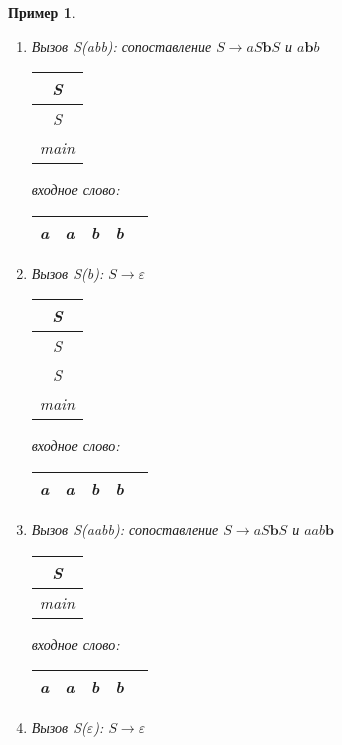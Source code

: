 \documentclass[10pt]{article}         %
\newtheorem{example}{Пример}
\begin{document}
\begin{example}
\begin{enumerate}
			\item Вызов S(abb): сопоставление $S \rightarrow aS\textbf{b}S$ и $a\textbf{b}b$
			
			\begin{tabular}[c]{ |c| } 
				\\ \hline
				S \\ \hline
				S \\ \hline
				main \\ \hline
			\end{tabular}  
			\qquad  \qquad \qquad  \qquad входное слово: \,
			\begin{tabular}[c]{ |c|c|c|c|c| } 
				\hline
				a & a & \textbf{b} & b \\ \hline
			\end{tabular}
		
		\item Вызов S(b): $S \rightarrow \varepsilon$
		
		\begin{tabular}[c]{ |c| } 
			\\ \hline
			S \\ \hline
			S \\ \hline
			S \\ \hline
			main \\ \hline
		\end{tabular}  
		\qquad  \qquad \qquad  \qquad входное слово: \,
		\begin{tabular}[c]{ |c|c|c|c|c| } 
			\hline
			a & a & \textbf{b} & b \\ \hline
		\end{tabular}
		
		\item Вызов S(aabb): сопоставление $S \rightarrow aS\textbf{b}S$ и $aab\textbf{b}$
		
		\begin{tabular}[c]{ |c| } 
			\\ \hline
			S \\ \hline
			main \\ \hline
		\end{tabular}  
		\qquad  \qquad \qquad  \qquad входное слово: \,
		\begin{tabular}[c]{ |c|c|c|c|c| } 
			\hline
			a & a & b & \textbf{b} \\ \hline
		\end{tabular}
		
		\item Вызов S($\varepsilon$): $S \rightarrow \varepsilon$
		

\end{enumerate}
\end{example}
\end{document}
